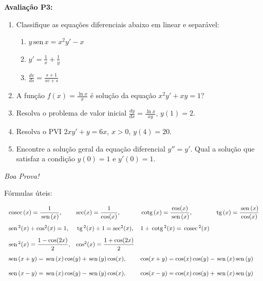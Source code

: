 \documentclass[a4paper,5pt]{amsbook}
\newcommand{\sen}{\,\mbox{sen}\,}
\newcommand{\tg}{\,\mbox{tg}\,}
\newcommand{\cosec}{\,\mbox{cosec}\,}
\newcommand{\cotg}{\,\mbox{cotg}\,}
\newcommand{\ds}{\displaystyle}
\begin{document}
\vspace{0.5cm}
\textbf{Avalia\c{c}\~ao P3:}
\begin{enumerate}
	\vspace{0.5cm}
	\item Classifique as equa\c{c}\~oes diferenciais abaixo em linear e separ\'avel:
		\begin{enumerate}
			\vspace{0.3cm}
			\item $y \sen{x} = x^2 y' - x$
			\vspace{0.3cm}
			\item $y' = \ds\frac{1}{x} + \frac{1}{y}$
			\vspace{0.1cm}
			\item $\ds\frac{dv}{ds} = \frac{s+1}{sv+s}$
		\end{enumerate}
	\vspace{0.5cm}
	\item A fun\c{c}\~ao $\ds f(x) = \frac{\ln{x}}{x}$ \'e solu\c{c}\~ao da equa\c{c}\~ao $x^2 y' + xy = 1$?
	\vspace{0.5cm}
	\item Resolva o problema de valor inicial $\ds\frac{dy}{dx} = \frac{\ln{x}}{xy}$, $y(1)=2$.
	\vspace{0.5cm}
	\item Resolva o PVI $2xy' + y = 6x$, $x>0$, $y(4) = 20$.
	\vspace{0.5cm}
	\item Encontre a solu\c{c}\~ao geral da equa\c{c}\~ao diferencial $y'' = y'$. Qual a solu\c{c}\~ao que satisfaz a condi\c{c}\~ao $y(0) = 1$ e $y'(0) = 1$.
\end{enumerate}

\begin{flushright}
	\vspace{1cm}
	\textit{Boa Prova!}
\end{flushright}

\vfill{}
F\'ormulas \'uteis:

\[\begin{array}{llll}
	\vspace{0.3cm}
	\cosec(x) = \displaystyle\frac{1}{\sen(x)}, & \sec(x) = \displaystyle\frac{1}{\cos(x)}, & \cotg(x) = \displaystyle\frac{\cos(x)}{\sen(x)}, & \ds\tg(x) = \frac{\sen(x)}{\cos(x)}\\
	\vspace{0.3cm}
	\sen^2(x) + \cos^2(x) = 1, & \tg^2(x) + 1 = \sec^2(x), & 1 + \cotg^2(x) = \cosec^2(x) & \\
	\vspace{0.3cm}
	\sen^2(x) = \displaystyle\frac{1 - \cos(2x)}{2}, & \cos^2(x) = \displaystyle\frac{1 + \cos(2x)}{2} & & \\
	\multicolumn{2}{l}{\sen(x+y) = \displaystyle\sen(x)\cos(y) + \sen(y)\cos(x),} & \multicolumn{2}{l}{\cos(x+y) = \displaystyle\cos(x)\cos(y) - \sen(x)\sen(y)} \\
	& & & \\
	\multicolumn{2}{l}{\sen(x-y) = \displaystyle\sen(x)\cos(y) - \sen(y)\cos(x),} & \multicolumn{2}{l}{\cos(x-y) = \displaystyle\cos(x)\cos(y) + \sen(x)\sen(y)}
\end{array}\]
\end{document}
